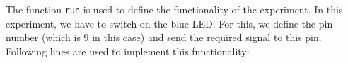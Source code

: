 \begin{enumerate}
        
        
    The function {\tt run} is used to define the functionality of the experiment. In this experiment, 
    we have to switch on the blue LED. For this, we define the pin number (which is 9 in this case) 
    and send the required signal to this pin. Following lines are used to implement this functionality:
    


\end{enumerate}

